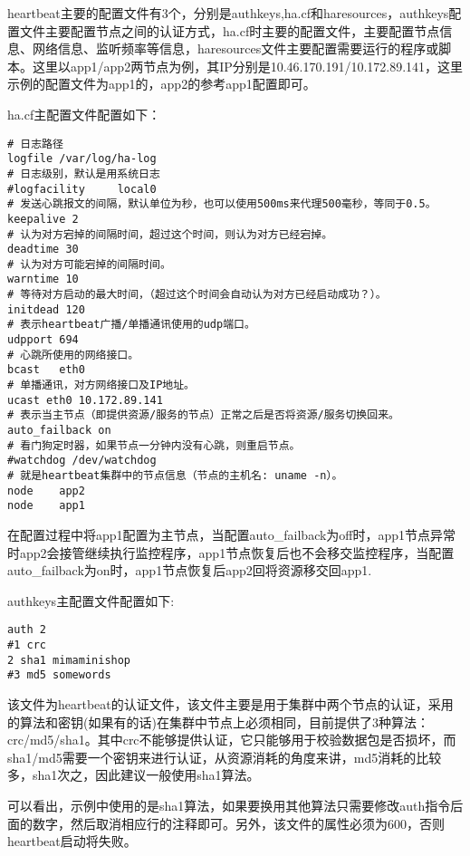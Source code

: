 \begin{enumerate}
heartbeat主要的配置文件有3个，分别是authkeys,ha.cf和haresources，authkeys配置文件主要配置节点之间的认证方式，ha.cf时主要的配置文件，主要配置节点信息、网络信息、监听频率等信息，haresources文件主要配置需要运行的程序或脚本。这里以app1/app2两节点为例，其IP分别是10.46.170.191/10.172.89.141，这里示例的配置文件为app1的，app2的参考app1配置即可。

ha.cf主配置文件配置如下：
\begin{lstlisting}[numbers=none]
# 日志路径
logfile /var/log/ha-log
# 日志级别，默认是用系统日志
#logfacility     local0
# 发送心跳报文的间隔，默认单位为秒，也可以使用500ms来代理500毫秒，等同于0.5。
keepalive 2
# 认为对方宕掉的间隔时间，超过这个时间，则认为对方已经宕掉。
deadtime 30
# 认为对方可能宕掉的间隔时间。
warntime 10
# 等待对方启动的最大时间，（超过这个时间会自动认为对方已经启动成功？）。
initdead 120
# 表示heartbeat广播/单播通讯使用的udp端口。
udpport 694
# 心跳所使用的网络接口。
bcast   eth0
# 单播通讯，对方网络接口及IP地址。
ucast eth0 10.172.89.141
# 表示当主节点（即提供资源/服务的节点）正常之后是否将资源/服务切换回来。
auto_failback on
# 看门狗定时器，如果节点一分钟内没有心跳，则重启节点。
#watchdog /dev/watchdog
# 就是heartbeat集群中的节点信息（节点的主机名: uname -n）。
node    app2
node    app1
\end{lstlisting}
在配置过程中将app1配置为主节点，当配置auto\_failback为off时，app1节点异常时app2会接管继续执行监控程序，app1节点恢复后也不会移交监控程序，当配置auto\_failback为on时，app1节点恢复后app2回将资源移交回app1.

authkeys主配置文件配置如下:
\begin{lstlisting}[numbers=none]
auth 2
#1 crc
2 sha1 mimaminishop
#3 md5 somewords
\end{lstlisting}
该文件为heartbeat的认证文件，该文件主要是用于集群中两个节点的认证，采用的算法和密钥(如果有的话)在集群中节点上必须相同，目前提供了3种算法：crc/md5/sha1。其中crc不能够提供认证，它只能够用于校验数据包是否损坏，而sha1/md5需要一个密钥来进行认证，从资源消耗的角度来讲，md5消耗的比较多，sha1次之，因此建议一般使用sha1算法。

可以看出，示例中使用的是sha1算法，如果要换用其他算法只需要修改auth指令后面的数字，然后取消相应行的注释即可。另外，该文件的属性必须为600，否则heartbeat启动将失败。


\end{enumerate}
